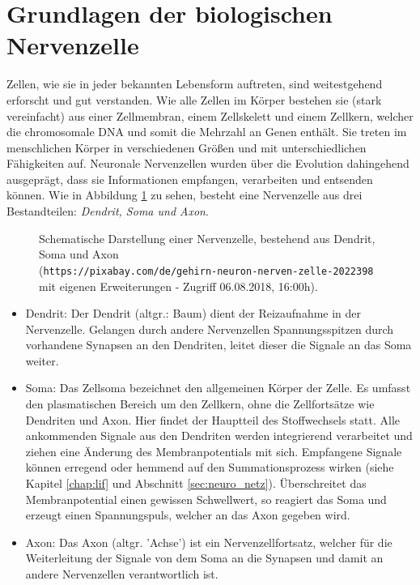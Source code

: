 \section{Grundlagen der biologischen Nervenzelle}
\label{sec:neuro_nervenzelle}
	Zellen, wie sie in jeder bekannten Lebensform auftreten, sind weitestgehend erforscht und gut verstanden. Wie alle Zellen im Körper bestehen sie (stark vereinfacht) aus einer Zellmembran, einem Zellskelett und einem Zellkern, welcher die chromosomale DNA und somit die Mehrzahl an Genen enthält. Sie treten im menschlichen Körper in verschiedenen Größen und mit unterschiedlichen Fähigkeiten auf. Neuronale Nervenzellen wurden über die Evolution dahingehend ausgeprägt, dass sie Informationen empfangen, verarbeiten und entsenden können. Wie in Abbildung \ref{fig:neuron} zu sehen, besteht eine Nervenzelle aus drei Bestandteilen: \textit{Dendrit, Soma und Axon}.
	\begin{figure}[H] %
		\centering
		\def\svgwidth{12cm}
		
		\caption{Schematische Darstellung einer Nervenzelle, bestehend aus Dendrit, Soma und Axon\\(\texttt{https://pixabay.com/de/gehirn-neuron-nerven-zelle-2022398} mit eigenen Erweiterungen - Zugriff 06.08.2018, 16:00h).}
		\label{fig:neuron}
	\end{figure}
	\begin{itemize}
		\item Dendrit:
			\subitem Der Dendrit (altgr.: \glqq Baum\grqq) dient der Reizaufnahme in der Nervenzelle. Gelangen durch andere Nervenzellen Spannungsspitzen durch vorhandene Synapsen an den Dendriten, leitet dieser die Signale an das Soma weiter.
		\item Soma:
			\subitem Das Zellsoma bezeichnet den allgemeinen Körper der Zelle. Es umfasst den plasmatischen Bereich um den Zellkern, ohne die Zellfortsätze wie Dendriten und Axon. Hier findet der Hauptteil des Stoffwechsels statt. Alle ankommenden Signale aus den Dendriten werden integrierend verarbeitet und ziehen eine Änderung des Membranpotentials mit sich. Empfangene Signale können erregend oder hemmend auf den Summationsprozess wirken (siehe Kapitel \ref{chap:lif} und Abschnitt \ref{sec:neuro_netz}). Überschreitet das Membranpotential einen gewissen Schwellwert, so reagiert das Soma und erzeugt einen Spannungspuls, welcher an das Axon gegeben wird.
		\item Axon:
			\subitem Das Axon (altgr. 'Achse') ist ein Nervenzellfortsatz, welcher für die Weiterleitung der Signale von dem Soma an die Synapsen und damit an andere Nervenzellen verantwortlich ist.
	\end{itemize}
